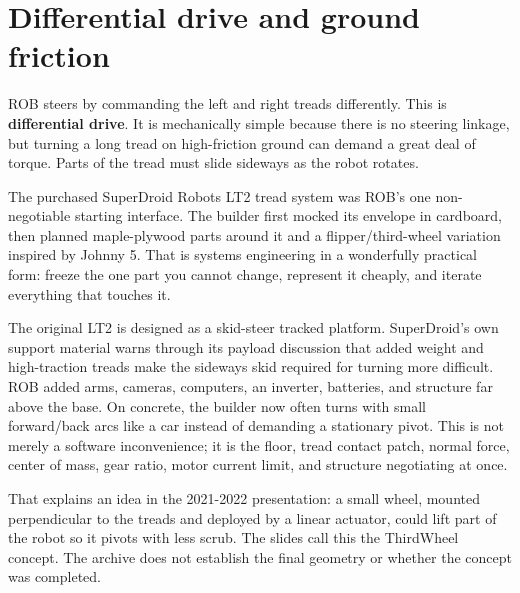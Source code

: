 \documentclass[11pt,openany]{book}
\begin{document}

\chapter{Differential drive and ground friction}

ROB steers by commanding the left and right treads differently. This is \textbf{differential drive}. It is mechanically simple because there is no steering linkage, but turning a long tread on high-friction ground can demand a great deal of torque. Parts of the tread must slide sideways as the robot rotates.

The purchased SuperDroid Robots LT2 tread system was ROB's one non-negotiable starting interface. The builder first mocked its envelope in cardboard, then planned maple-plywood parts around it and a flipper/third-wheel variation inspired by Johnny 5. That is systems engineering in a wonderfully practical form: freeze the one part you cannot change, represent it cheaply, and iterate everything that touches it.

The original LT2 is designed as a skid-steer tracked platform. SuperDroid's own support material warns through its payload discussion that added weight and high-traction treads make the sideways skid required for turning more difficult. ROB added arms, cameras, computers, an inverter, batteries, and structure far above the base. On concrete, the builder now often turns with small forward/back arcs like a car instead of demanding a stationary pivot. This is not merely a software inconvenience; it is the floor, tread contact patch, normal force, center of mass, gear ratio, motor current limit, and structure negotiating at once.

That explains an idea in the 2021-2022 presentation: a small wheel, mounted perpendicular to the treads and deployed by a linear actuator, could lift part of the robot so it pivots with less scrub. The slides call this the ThirdWheel concept. The archive does not establish the final geometry or whether the concept was completed.

\end{document}
